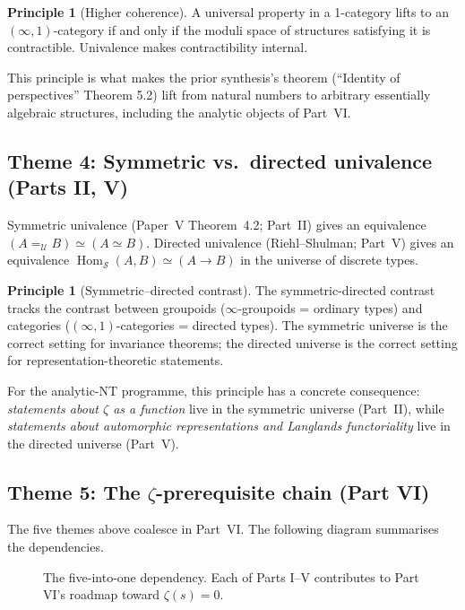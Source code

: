 \documentclass[12pt]{article}
\theoremstyle{definition}
\newtheorem{principle}[theorem]{Principle}
\theoremstyle{remark}
\newcommand{\Type}{\mathcal{U}}
\newcommand{\N}{\mathbb{N}}
\newcommand{\R}{\mathbb{R}}
\newcommand{\C}{\mathbb{C}}
\newcommand{\Rc}{\R_{c}}
\newcommand{\Cc}{\C_{c}}
\newcommand{\Spc}{\mathcal{S}}
\newcommand{\dua}{\mathsf{dua}}
\DeclareMathOperator{\Hom}{Hom}
\begin{document}
\begin{principle}[Higher coherence]\label{prin:coherence}
A universal property in a 1-category lifts to an $(\infty,1)$-category
if and only if the moduli space of structures satisfying it is
contractible. Univalence makes contractibility internal.
\end{principle}

This principle is what makes the prior synthesis's theorem
(``Identity of perspectives'' Theorem 5.2) lift from natural numbers to
arbitrary essentially algebraic structures, including the analytic
objects of Part~VI.

\subsection{Theme 4: Symmetric vs.\ directed univalence (Parts II, V)}

Symmetric univalence (Paper~V Theorem~4.2; Part~II) gives an equivalence
$(A =_{\Type} B) \simeq (A \simeq B)$. Directed univalence
(Riehl--Shulman; Part~V) gives an equivalence
$\Hom_{\Spc}(A, B) \simeq (A \to B)$ in the universe of discrete types.

\begin{principle}[Symmetric--directed contrast]\label{prin:dualUniv}
The symmetric-directed contrast tracks the contrast between groupoids
($\infty$-groupoids = ordinary types) and categories
($(\infty,1)$-categories = directed types). The symmetric universe is the
correct setting for invariance theorems; the directed universe is the
correct setting for representation-theoretic statements.
\end{principle}

For the analytic-NT programme, this principle has a concrete
consequence: \emph{statements about $\zeta$ as a function} live in the
symmetric universe (Part~II), while \emph{statements about automorphic
representations and Langlands functoriality} live in the directed
universe (Part~V).

\subsection{Theme 5: The \texorpdfstring{$\zeta$}{zeta}-prerequisite chain (Part VI)}

The five themes above coalesce in Part~VI\@. The following diagram
summarises the dependencies.

\begin{figure}[htbp]
\centering
{}
\caption{The five-into-one dependency. Each of Parts I--V contributes to
Part VI's roadmap toward $\zeta(s)=0$.}\label{fig:fivedep}
\end{figure}
\end{document}
